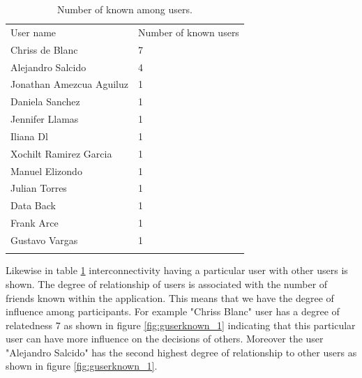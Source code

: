 \begin{table}
\small
\caption{Number of known among users.}
\label{tab:knownUsers_1}
\centering
\small
\begin{tabular}{p{3cm} p{3cm}  }
\hline\noalign{\smallskip}
 User name & Number of known users \\
\noalign{\smallskip}\hline\noalign{\smallskip}
\small{Chriss de Blanc } & \small{7}  \\ \hline
\small{Alejandro Salcido } & \small{4}  \\ \hline
\small{Jonathan Amezcua Aguiluz } & \small{1}  \\ \hline
\small{Daniela Sanchez } & \small{1}  \\ \hline
\small{Jennifer Llamas} & \small{1}  \\ \hline
\small{Iliana Dl } & \small{1}  \\ \hline
\small{Xochilt Ramirez Garcia } & \small{1}  \\ \hline
\small{Manuel Elizondo } & \small{1}  \\ \hline
\small{Julian Torres } & \small{1}  \\ \hline
\small{Data Back } & \small{1}  \\ \hline
\small{Frank Arce } & \small{1}  \\ \hline
\small{Gustavo Vargas } & \small{1}  \\ \hline
\noalign{\smallskip}\hline
\end{tabular}
\end{table}

Likewise in table \ref{tab:knownUsers_1} interconnectivity having a particular
user with other users is shown. The degree of relationship of users is
associated with the number of friends known within the application. This means
that we have the degree of influence among participants. For example  "Chriss
Blanc" user has a degree of relatedness 7 as shown in figure
\ref{fig:guserknown_1} indicating that this particular user can have more
influence on the decisions of others. Moreover the user "Alejandro Salcido" has
the second highest degree of relationship to other users as shown in figure
\ref{fig:guserknown_1}.

